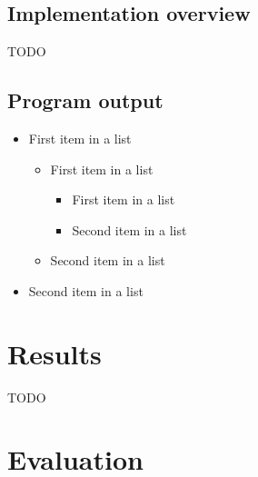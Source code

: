 \documentclass{article}
\numberwithin{equation}{section}		%
\numberwithin{figure}{section}			%
\numberwithin{table}{section}				%
\begin{document}
\subsection{}

\subsection{Implementation overview}
TODO

\subsection{Program output}
\begin{itemize}
	\item First item in a list 
		\begin{itemize}
		\item First item in a list 
			\begin{itemize}
			\item First item in a list 
			\item Second item in a list 
			\end{itemize}
		\item Second item in a list 
		\end{itemize}
	\item Second item in a list 
\end{itemize}

\section{Results}
TODO

\section{Evaluation}




\end{document}
